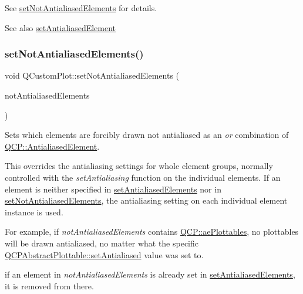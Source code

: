 See \hyperlink{class_q_custom_plot_ae10d685b5eabea2999fb8775ca173c24}{set\+Not\+Antialiased\+Elements} for details.

\begin{DoxySeeAlso}{See also}
\hyperlink{class_q_custom_plot_aeef813bcf7efab8e765f9f87ec454691}{set\+Antialiased\+Element} 
\end{DoxySeeAlso}
\mbox{\label{class_q_custom_plot_ae10d685b5eabea2999fb8775ca173c24}} 
\subsubsection{\texorpdfstring{set\+Not\+Antialiased\+Elements()}{setNotAntialiasedElements()}}
{\footnotesize\ttfamily void Q\+Custom\+Plot\+::set\+Not\+Antialiased\+Elements (\begin{DoxyParamCaption}\item[{const Q\+C\+P\+::\+Antialiased\+Elements \&}]{not\+Antialiased\+Elements }\end{DoxyParamCaption})}

Sets which elements are forcibly drawn not antialiased as an {\itshape or} combination of \hyperlink{namespace_q_c_p_ae55dbe315d41fe80f29ba88100843a0c}{Q\+C\+P\+::\+Antialiased\+Element}.

This overrides the antialiasing settings for whole element groups, normally controlled with the {\itshape set\+Antialiasing} function on the individual elements. If an element is neither specified in \hyperlink{class_q_custom_plot_af6f91e5eab1be85f67c556e98c3745e8}{set\+Antialiased\+Elements} nor in \hyperlink{class_q_custom_plot_ae10d685b5eabea2999fb8775ca173c24}{set\+Not\+Antialiased\+Elements}, the antialiasing setting on each individual element instance is used.

For example, if {\itshape not\+Antialiased\+Elements} contains \hyperlink{namespace_q_c_p_ae55dbe315d41fe80f29ba88100843a0cab057dff2d0ecd9a98209d0e45f9f4477}{Q\+C\+P\+::ae\+Plottables}, no plottables will be drawn antialiased, no matter what the specific \hyperlink{class_q_c_p_layerable_a4fd43e89be4a553ead41652565ff0581}{Q\+C\+P\+Abstract\+Plottable\+::set\+Antialiased} value was set to.

if an element in {\itshape not\+Antialiased\+Elements} is already set in \hyperlink{class_q_custom_plot_af6f91e5eab1be85f67c556e98c3745e8}{set\+Antialiased\+Elements}, it is removed from there.

